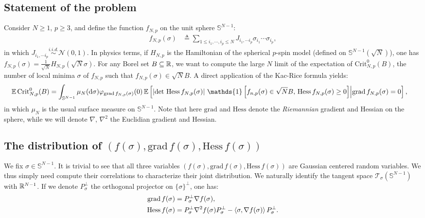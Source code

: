 \documentclass[amsmath,amssymb,nofootinbib,prd]{article}
\begin{document}
	\subsection{Statement of the problem}
	Consider $N \geq 1$, $p \geq 3$, and define the function $f_{N,p}$ on the unit sphere $\mathbb{S}^{N-1}$:
	\begin{align}
	f_{N,p}(\sigma) &\triangleq \sum_{1 \leq i_1,\cdots,i_p \leq N} J_{i_1,\cdots i_p} \sigma_{i_1} \cdots \sigma_{i_p},
	\end{align}
	in which $J_{i_1,\cdots i_p} \overset{i.i.d.}{\sim} \mathcal{N}(0,1)$. In physics terms, if $H_{N,p}$ is the Hamiltonian of the spherical $p$-spin model (defined on $\mathbb{S}^{N-1}(\sqrt{N})$), one has $f_{N,p}(\sigma) = \frac{1}{\sqrt{N}} H_{N,p}(\sqrt{N}\sigma)$.  For any Borel set $B \subseteq \mathbb{R}$, we want to compute the large $N$ limit of the expectation of $\mathrm{Crit}_{N,p}^0(B)$, the number of local minima $\sigma$ of $f_{N,p}$ such that $f_{N,p}(\sigma) \in \sqrt{N} B$. 
	A direct application of the Kac-Rice formula yields:
	\begin{align*}
	\EE \, \mathrm{Crit}_{N,p}^0(B) &= \int_{\mathbb{S}^{N-1}} \mu_N(\mathrm{d}\sigma) \varphi_{\mathrm{grad}\, f_{N,p}(\sigma)}(0) \, \EE \left[\left|\det \, \mathrm{Hess}\, f_{N,p}(\sigma)\right| \, \mathds{1}\left[f_{n,p}(\sigma) \in \sqrt{N} B,\, \mathrm{Hess}\, f_{N,p}(\sigma) \geq 0\right] \middle| \mathrm{grad}\, f_{N,p}(\sigma) = 0 \right],
	\end{align*}
in which $\mu_N$ is the usual surface measure on $\mathbb{S}^{N-1}$. Note that here $\mathrm{grad}$ and $\mathrm{Hess}$ denote the \emph{Riemannian} gradient and Hessian on the sphere, while we will denote $\nabla$, $\nabla^2$ the Euclidian gradient and Hessian. 
	
	\subsection{The distribution of $(f(\sigma),\mathrm{grad}\, f(\sigma),\mathrm{Hess}\, f(\sigma))$}
	
	We fix $\sigma  \in \mathbb{S}^{N-1}$. It is trivial to see that all three variables $(f(\sigma),\mathrm{grad}\, f(\sigma),\mathrm{Hess}\, f(\sigma))$ are Gaussian centered random variables. We thus simply need compute their correlations to characterize their joint distribution. We naturally identify the tangent space $\mathcal{T}_\sigma(\mathbb{S}^{N-1})$ with $\mathbb{R}^{N-1}$. If we denote $P_\sigma^\perp$ the orthogonal projector on $\{\sigma\}^\perp$, one has:
	\begin{align}
	\mathrm{grad}\, f(\sigma) &= P_\sigma^\perp \nabla f(\sigma), \\
	\mathrm{Hess}\, f(\sigma) &= P_\sigma^\perp \nabla^2 f(\sigma) P_{\sigma}^\perp - \braket{\sigma,\nabla f(\sigma)} P_\sigma^\perp.
	\end{align}
	
\end{document}
